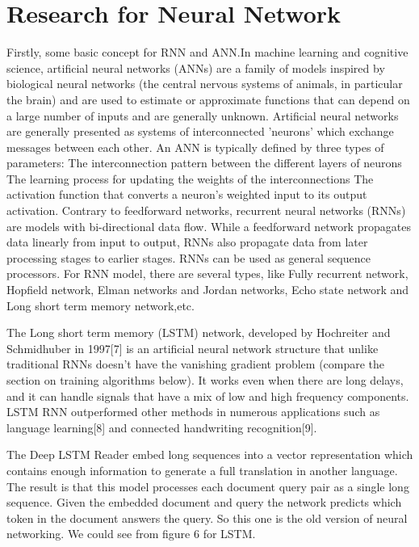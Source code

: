 \documentclass[runningheads,a4paper]{llncs}
\begin{document}
\section{Research for Neural Network}
Firstly, some basic concept for RNN and ANN.In machine learning and cognitive science, artificial neural networks (ANNs) are a family of models inspired by biological neural networks (the central nervous systems of animals, in particular the brain) and are used to estimate or approximate functions that can depend on a large number of inputs and are generally unknown. Artificial neural networks are generally presented as systems of interconnected 'neurons' which exchange messages between each other. 
An ANN is typically defined by three types of parameters:
The interconnection pattern between the different layers of neurons
The learning process for updating the weights of the interconnections
The activation function that converts a neuron's weighted input to its output activation.
Contrary to feedforward networks, recurrent neural networks (RNNs) are models with bi-directional data flow. While a feedforward network propagates data linearly from input to output, RNNs also propagate data from later processing stages to earlier stages. RNNs can be used as general sequence processors.
For RNN model, there are several types, like Fully recurrent network, Hopfield network, Elman networks and Jordan networks, Echo state network and Long short term memory network,etc.

The Long short term memory (LSTM) network, developed by Hochreiter and Schmidhuber in 1997[7] is an artificial neural network structure that unlike traditional RNNs doesn't have the vanishing gradient problem (compare the section on training algorithms below). It works even when there are long delays, and it can handle signals that have a mix of low and high frequency components. LSTM RNN outperformed other methods in numerous applications such as language learning[8] and connected handwriting recognition[9].



The Deep LSTM Reader embed long sequences into a vector representation which contains enough information to generate a full translation in another language. The result is that this model processes each document query pair as a single long sequence. Given the embedded document and query the network predicts which token in the document answers the query. So this one is the old version of neural networking. We could see from figure 6 for LSTM.
\end{document}
